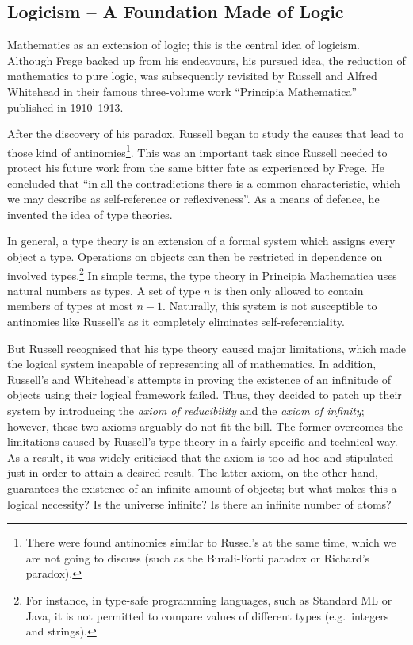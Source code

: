 \documentclass{article}
\begin{document}
\subsection{Logicism -- A Foundation Made of Logic}\label{ssec_logicism}
Mathematics as an extension of logic; this is the central idea of logicism. Although Frege backed up from his endeavours, his pursued idea, the reduction of mathematics to pure logic, was subsequently revisited by Russell and Alfred Whitehead in their famous three-volume work ``Principia Mathematica'' published in 1910--1913.

After the discovery of his paradox, Russell began to study the causes that lead to those kind of antinomies\footnote{There were found antinomies similar to Russel's at the same time, which we are not going to discuss (such as the Burali-Forti paradox or Richard's paradox).\cite[pp.~5--10]{fraenkel}}. This was an important task since Russell needed to protect his future work from the same bitter fate as experienced by Frege. He concluded that ``in all the contradictions there is a common characteristic, which we may describe as self-reference or reflexiveness''\cite[p. 224]{russell_self_referentiality}. As a means of defence, he invented the idea of type theories. 

In general, a type theory is an extension of a formal system which assigns every object a type. Operations on objects can then be restricted in dependence on involved types.\footnote{For instance, in type-safe programming languages, such as Standard ML or Java, it is not permitted to compare values of different types (e.g.\ integers and strings).} In simple terms, the type theory in Principia Mathematica uses natural numbers as types. A set of type $n$ is then only allowed to contain members of types at most $n-1$. Naturally, this system is not susceptible to antinomies like Russell's as it completely eliminates self-referentiality. 

But Russell recognised that his type theory caused major limitations, which made the logical system incapable of representing all of mathematics. In addition, Russell's and Whitehead's attempts in proving the existence of an infinitude of objects using their logical framework failed. Thus, they decided to patch up their system by introducing the \textit{axiom of reducibility} and the \textit{axiom of infinity}; however, these two axioms arguably do not fit the bill. The former overcomes the limitations caused by Russell's type theory in a fairly specific and technical way. As a result, it was widely criticised that the axiom is too ad hoc and stipulated just in order to attain a desired result.
The latter axiom, on the other hand, guarantees the existence of an infinite amount of objects; but what makes this a logical necessity? Is the universe infinite? Is there an infinite number of atoms?
\end{document}
